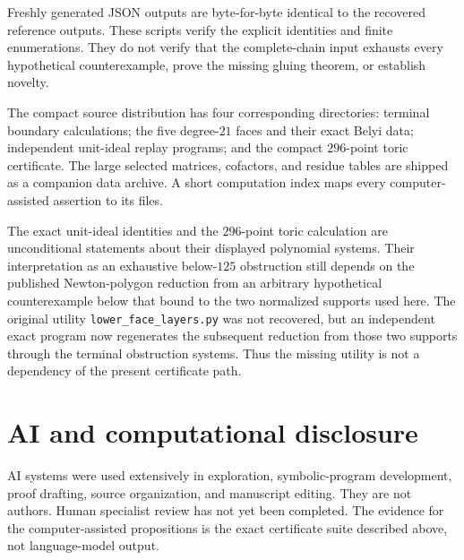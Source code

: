 \documentclass[11pt,reqno]{amsart}
\begin{document}
Freshly generated JSON outputs are byte-for-byte identical to the recovered
reference outputs.  These scripts verify the explicit identities and finite
enumerations.  They do not verify that the complete-chain input exhausts
every hypothetical counterexample, prove the missing gluing theorem, or
establish novelty.

The compact source distribution has four corresponding directories: terminal
boundary calculations; the five degree-\(21\) faces and their exact Belyi
data; independent unit-ideal replay programs; and the compact \(296\)-point
toric certificate.  The large selected matrices, cofactors, and residue
tables are shipped as a companion data archive.  A short computation index
maps every computer-assisted assertion to its files.

The exact unit-ideal identities and the \(296\)-point toric calculation are
unconditional statements about their displayed polynomial systems.  Their
interpretation as an exhaustive below-\(125\) obstruction still depends on
the published Newton-polygon reduction from an arbitrary hypothetical
counterexample below that bound to the two normalized supports used here.
The original utility \texttt{lower\_face\_layers.py} was not recovered, but
an independent exact program now regenerates the subsequent reduction from
those two supports through the terminal obstruction systems.  Thus the
missing utility is not a dependency of the present certificate path.

\appendix





\section*{AI and computational disclosure}

AI systems were used extensively in exploration, symbolic-program
development, proof drafting, source organization, and manuscript editing.
They are not authors.  Human specialist review has not yet been completed.
The evidence for the computer-assisted propositions is the exact certificate
suite described above, not language-model output.



\end{document}
